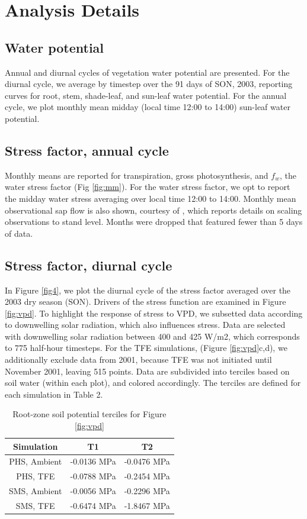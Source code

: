 \documentclass[draft,linenumbers]{agujournal}
\begin{document}
\section{Analysis Details}  
\subsection{Water potential}

Annual and diurnal cycles of vegetation water potential are presented.
For the diurnal cycle, we average by timestep over the 91 days of SON, 2003, reporting curves for root, stem, shade-leaf, and sun-leaf water potential.
For the annual cycle, we plot monthly mean midday (local time 12:00 to 14:00) sun-leaf water potential.

\subsection{Stress factor, annual cycle}
    Monthly means are reported for transpiration, gross photosynthesis, and $f_w$, the water stress factor (Fig \ref{fig:mm}).
    For the water stress factor, we opt to report the midday water stress averaging over local time 12:00 to 14:00.
    Monthly mean observational sap flow is also shown, courtesy of \cite{fisher2007}, which reports details on scaling observations to stand level.
    Months were dropped that featured fewer than 5 days of data.

\subsection{Stress factor, diurnal cycle}
    In Figure \ref{fig4}, we plot the diurnal cycle of the stress factor averaged over the 2003 dry season (SON).
    Drivers of the stress function are examined in Figure \ref{fig:vpd}.
    To highlight the response of stress to VPD, we subsetted data according to downwelling solar radiation, which also influences stress.
    Data are selected with downwelling solar radiation between 400 and 425 W/m2, which corresponds to 775 half-hour timesteps.
    For the TFE simulations, (Figure \ref{fig:vpd}c,d), we additionally exclude data from 2001, because TFE was not initiated until November 2001, leaving 515 points.
    Data are subdivided into terciles based on soil water (within each plot), and colored accordingly.
    The terciles are defined for each simulation in Table 2.
\begin{table}
\caption{Root-zone soil potential terciles for Figure \ref{fig:vpd}}
\centering
\begin{tabular}{c c c }
Simulation & T1 & T2 \\
\hline
PHS, Ambient & -0.0136 MPa & -0.0476 MPa \\
PHS, TFE & -0.0788 MPa & -0.2454 MPa \\
SMS, Ambient & -0.0056 MPa & -0.2296 MPa \\
SMS, TFE & -0.6474 MPa & -1.8467 MPa \\
\hline

\end{tabular}
\end{table}
    
\end{document}

